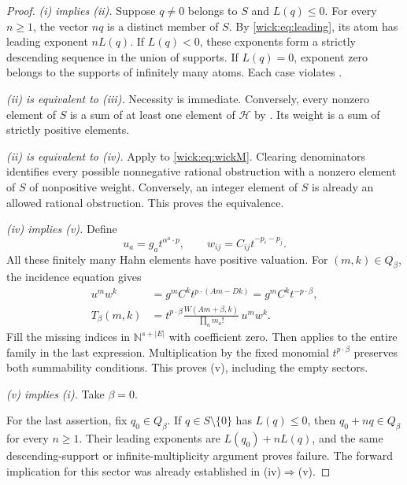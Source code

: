 \documentclass[11pt,letterpaper]{article}
\numberwithin{equation}{section}
\theoremstyle{definition}
\theoremstyle{remark}
\newcommand{\N}{\mathbb N}
\newcommand{\cH}{\mathcal H}
\newcommand{\abs}[1]{\lvert#1\rvert}
\begin{document}
\begin{proof}
\emph{(i) implies (ii).} Suppose $q\ne0$ belongs to $S$ and $L(q)\le0$.
For every $n\ge1$, the vector $nq$ is a distinct member of $S$. By
\eqref{wick:eq:leading}, its atom has leading exponent $nL(q)$. If $L(q)<0$,
these exponents form a strictly descending sequence in the union of supports.
If $L(q)=0$, exponent zero belongs to the supports of infinitely many atoms.
Each case violates .

\emph{(ii) is equivalent to (iii).} Necessity is immediate. Conversely, every
nonzero element of $S$ is a sum of at least one element of $\cH$ by
. Its weight is a sum of strictly positive elements.

\emph{(ii) is equivalent to (iv).} Apply  to
\eqref{wick:eq:wickM}. Clearing denominators identifies every possible
nonnegative rational obstruction with a nonzero element of $S$ of
nonpositive weight. Conversely, an integer element of $S$ is already an
allowed rational obstruction. This proves the equivalence.

\emph{(iv) implies (v).} Define
\begin{equation}
 u_a=g_a t^{\alpha^a\cdot p},\qquad
 w_{ij}=C_{ij}t^{-p_i-p_j}.
 \label{wick:eq:scaleddata}
\end{equation}
All these finitely many Hahn elements have positive valuation. For
$(m,k)\in Q_\beta$, the incidence equation gives
\begin{align}
 u^m w^k
 &=g^m C^k t^{p\cdot(Am-Dk)}
 =g^m C^k t^{-p\cdot\beta},\\
 T_\beta(m,k)
 &=t^{p\cdot\beta}
 \frac{W(Am+\beta,k)}{\prod_a m_a!}\,u^m w^k.
 \label{wick:eq:scaledatom}
\end{align}
Fill the missing indices in $\N^{s+\abs E}$ with coefficient zero. Then
 applies to the entire family in the last expression.
Multiplication by the fixed monomial $t^{p\cdot\beta}$ preserves both
summability conditions. This proves (v), including the empty sectors.

\emph{(v) implies (i).} Take $\beta=0$.

For the last assertion, fix $q_0\in Q_\beta$. If $q\in S\setminus\{0\}$
has $L(q)\le0$, then $q_0+nq\in Q_\beta$ for every $n\ge1$. Their leading
exponents are $L(q_0)+nL(q)$, and the same descending-support or
infinite-multiplicity argument proves failure. The forward implication for
this sector was already established in (iv)$\Rightarrow$(v).
\end{proof}
\end{document}
